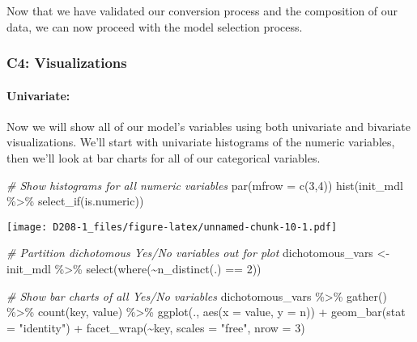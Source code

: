 \documentclass[
]{article}
\newenvironment{Shaded}{\begin{snugshade}}{\end{snugshade}}
\newcommand{\AttributeTok}[1]{\textcolor[rgb]{0.77,0.63,0.00}{#1}}
\newcommand{\CommentTok}[1]{\textcolor[rgb]{0.56,0.35,0.01}{\textit{#1}}}
\newcommand{\DecValTok}[1]{\textcolor[rgb]{0.00,0.00,0.81}{#1}}
\newcommand{\FunctionTok}[1]{\textcolor[rgb]{0.00,0.00,0.00}{#1}}
\newcommand{\NormalTok}[1]{#1}
\newcommand{\OtherTok}[1]{\textcolor[rgb]{0.56,0.35,0.01}{#1}}
\newcommand{\SpecialCharTok}[1]{\textcolor[rgb]{0.00,0.00,0.00}{#1}}
\newcommand{\StringTok}[1]{\textcolor[rgb]{0.31,0.60,0.02}{#1}}
\begin{document}
Now that we have validated our conversion process and the composition of
our data, we can now proceed with the model selection process.

\hypertarget{c4-visualizations}{%
\subsubsection{C4: Visualizations}\label{c4-visualizations}}

\hypertarget{univariate}{%
\paragraph{Univariate:}\label{univariate}}

Now we will show all of our model's variables using both univariate and
bivariate visualizations. We'll start with univariate histograms of the
numeric variables, then we'll look at bar charts for all of our
categorical variables.

\begin{Shaded}
\begin{Highlighting}[]
\CommentTok{\# Show histograms for all numeric variables}
\FunctionTok{par}\NormalTok{(}\AttributeTok{mfrow =} \FunctionTok{c}\NormalTok{(}\DecValTok{3}\NormalTok{,}\DecValTok{4}\NormalTok{))}
\FunctionTok{hist}\NormalTok{(init\_mdl }\SpecialCharTok{\%\textgreater{}\%} 
     \FunctionTok{select\_if}\NormalTok{(is.numeric))}
\end{Highlighting}
\end{Shaded}

\texttt{[image: D208-1\_files/figure-latex/unnamed-chunk-10-1.pdf]}

\begin{Shaded}
\begin{Highlighting}[]
\CommentTok{\# Partition dichotomous Yes/No variables out for plot}
\NormalTok{dichotomous\_vars }\OtherTok{\textless{}{-}}\NormalTok{ init\_mdl }\SpecialCharTok{\%\textgreater{}\%} 
  \FunctionTok{select}\NormalTok{(}\FunctionTok{where}\NormalTok{(}\SpecialCharTok{\textasciitilde{}}\FunctionTok{n\_distinct}\NormalTok{(.) }\SpecialCharTok{==} \DecValTok{2}\NormalTok{))}

\CommentTok{\# Show bar charts of all Yes/No variables}
\NormalTok{dichotomous\_vars }\SpecialCharTok{\%\textgreater{}\%}
  \FunctionTok{gather}\NormalTok{() }\SpecialCharTok{\%\textgreater{}\%}
  \FunctionTok{count}\NormalTok{(key, value) }\SpecialCharTok{\%\textgreater{}\%} 
  \FunctionTok{ggplot}\NormalTok{(., }\FunctionTok{aes}\NormalTok{(}\AttributeTok{x =}\NormalTok{ value, }\AttributeTok{y =}\NormalTok{ n)) }\SpecialCharTok{+}
  \FunctionTok{geom\_bar}\NormalTok{(}\AttributeTok{stat =} \StringTok{"identity"}\NormalTok{) }\SpecialCharTok{+}
  \FunctionTok{facet\_wrap}\NormalTok{(}\SpecialCharTok{\textasciitilde{}}\NormalTok{key, }\AttributeTok{scales =} \StringTok{"free"}\NormalTok{, }\AttributeTok{nrow =} \DecValTok{3}\NormalTok{)}
\end{Highlighting}
\end{Shaded}
\end{document}
